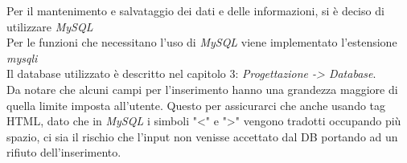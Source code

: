 Per il mantenimento e salvataggio dei dati e delle informazioni, si è deciso di utilizzare \emph{MySQL}\\
Per le funzioni che necessitano l'uso di \emph{MySQL} viene implementato l'estensione \emph{mysqli}\\
Il database utilizzato è descritto nel capitolo 3: \emph{Progettazione -> Database}.
\\
Da notare che alcuni campi per l'inserimento hanno una grandezza maggiore di quella limite imposta all'utente. Questo per assicurarci che anche usando tag HTML, dato che in \emph{MySQL} i simboli "<" e ">" vengono tradotti occupando più spazio, ci sia il rischio che l'input non venisse accettato dal DB portando ad un rifiuto dell'inserimento.